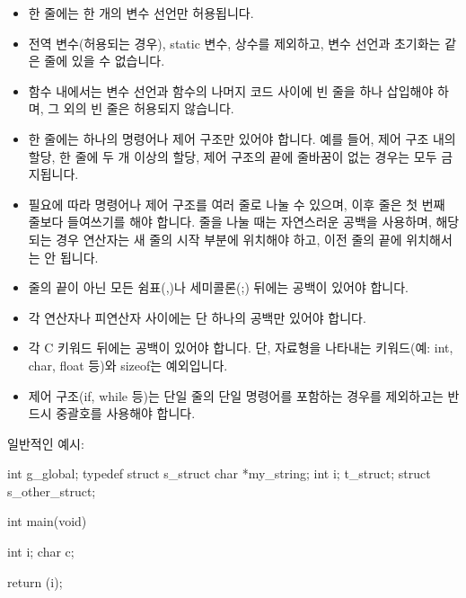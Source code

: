 \documentclass{42-ko}
\begin{document}
\begin{itemize}
                \item 한 줄에는 한 개의 변수 선언만 허용됩니다.

                \item 전역 변수(허용되는 경우), static 변수, 상수를 제외하고, 
                  변수 선언과 초기화는 같은 줄에 있을 수 없습니다.

                \item 함수 내에서는 변수 선언과 함수의 나머지 코드 사이에 빈 줄을 하나 
                  삽입해야 하며, 그 외의 빈 줄은 허용되지 않습니다.

                \item 한 줄에는 하나의 명령어나 제어 구조만 있어야 합니다. 
                  예를 들어, 제어 구조 내의 할당, 한 줄에 두 개 이상의 할당, 
                  제어 구조의 끝에 줄바꿈이 없는 경우는 모두 금지됩니다.

                \item 필요에 따라 명령어나 제어 구조를 여러 줄로 나눌 수 있으며, 
                  이후 줄은 첫 번째 줄보다 들여쓰기를 해야 합니다. 줄을 나눌 때는 
                  자연스러운 공백을 사용하며, 해당되는 경우 연산자는 새 줄의 
                  시작 부분에 위치해야 하고, 이전 줄의 끝에 위치해서는 안 됩니다.

                \item 줄의 끝이 아닌 모든 쉼표(,)나 세미콜론(;) 뒤에는 공백이 있어야 합니다.

                \item 각 연산자나 피연산자 사이에는 단 하나의 공백만 있어야 합니다.

                \item 각 C 키워드 뒤에는 공백이 있어야 합니다. 단, 자료형을 나타내는 
                  키워드(예: int, char, float 등)와 sizeof는 예외입니다.

                \item 제어 구조(if, while 등)는 단일 줄의 단일 명령어를 포함하는 
                  경우를 제외하고는 반드시 중괄호를 사용해야 합니다.

            \end{itemize}

\vspace{1cm}

            일반적인 예시:
            \begin{42ccode}
int             g_global;
typedef struct  s_struct
{
    char    *my_string;
    int     i;
}               t_struct;
struct          s_other_struct;

int     main(void)
{
    int     i;
    char    c;

    return (i);
}
            \end{42ccode}
            \newpage
\end{document}
